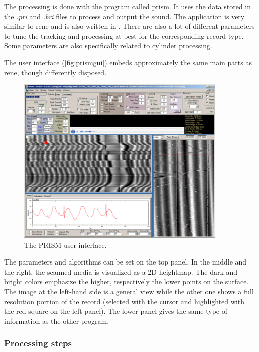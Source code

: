 The processing is done with the program called \gls{prism}. It uses the data stored in the \emph{.pri} and \emph{.bri} files to process and output the sound. The application is very similar to \gls{rene} and is also written in \Csh. There are also a lot of different parameters to tune the tracking and processing at best for the corresponding record type. Some parameters are also specifically related to cylinder processing.

The user interface (\autoref{fig:prismgui}) embeds approximately the same main parts as \gls{rene}, though differently disposed.

\begin{figure}[!ht]
\centering
\includegraphics[width=0.9\textwidth]{images/prism-gui}
\caption{The PRISM user interface.}
\label{fig:prismgui}
\end{figure}

The parameters and algorithms can be set on the top panel. In the middle and the right, the scanned media is visualized as a 2D heightmap. The dark and bright colors emphasize the higher, respectively the lower points on the surface. The image at the left-hand side is a general view while the other one shows a full resolution portion of the record (selected with the cursor and highlighted with the red square on the left panel). The lower panel gives the same type of information as the other program.

\subsubsection{Processing steps}
\label{sec:3dprocsteps}

